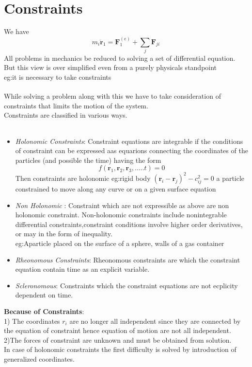 \section{Constraints}
We have
$$ m_i\ddot{\mathbf{r}}_1=\textbf{F}_1^{(e)}+\sum\limits_{j}\textbf{F}_{ji}$$
All problems in mechanics be reduced to solving a set of differential equation. But this view is over simplified even from a purely physicals standpoint \\
eg:it is necessary to take constraints\\\\
While solving a problem along with this we have to take consideration of constraints that limits the motion of the system.\\
Constraints are classified in various ways.\\\\
\begin{itemize}
\item \textit{Holonomic Constraints}: Constraint equations are integrable if the conditions of constraint can be expressed aas equarions connecting the coordinates of the particles (and possible the time) having the form
	$$ f(\textbf{r}_1,\textbf{r}_2, \textbf{r}_3,.....t)=0$$
	Then constraints are holonomic
	eg:rigid body $(\textbf{r}_i-\textbf{r}_j)^2-c_{ij}^2=0$
	a particle constrained to move along any curve or on a given surface equation\\
\item \textit{Non Holonomic }:
Constraint which are not expressible as above are non holonomic constraint.
Non-holonomic constraints include nonintegrable differential constraints,constraint conditions involve higher order derivatives, or may in the form of inequality.\\
eg:Aparticle placed on the surface of a sphere, walls of a gas container\\
\item \textit{Rheonomous Constraints}:
Rheonomous constraints are which the constraint equation contain time as an explicit variable.\\
\item \textit{Scleronomous}: 
Constraints which the constraint equations are not ecplicity dependent on time.\\
\end{itemize}
\textbf{Because of Constraints}:\\
1) The coordinates $r_i$ are no longer all independent since they are connected by the equation of constraint hence equation of motion are not all independent.\\
2)The forces of constraint are unknown and must be obtained from solution.\\
In case of holonomic constraints the first difficulty is solved by introduction of generalized coordinates.\\\\
